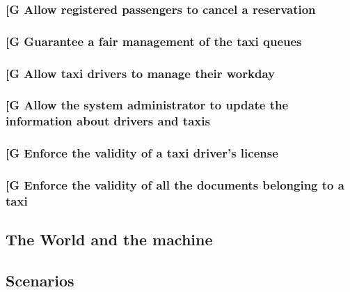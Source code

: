 \documentclass[a4paper,12pt]{article}%
\newcounter{goals_counter}
\begin{document}
\subsubsection{\label{goal\arabic{goals_counter}}{[}G\arabic{goals_counter}{]} Allow registered passengers to cancel a reservation}
\subsubsection{\label{goal\arabic{goals_counter}}{[}G\arabic{goals_counter}{]} Guarantee a fair management of the taxi queues}
\subsubsection{\label{goal\arabic{goals_counter}}{[}G\arabic{goals_counter}{]} Allow taxi drivers to manage their workday}
\subsubsection{\label{goal\arabic{goals_counter}}{[}G\arabic{goals_counter}{]} Allow the system administrator to update the information about drivers and taxis}
\subsubsection{\label{goal\arabic{goals_counter}}{[}G\arabic{goals_counter}{]} Enforce the validity of a taxi driver's license}
\subsubsection{\label{goal\arabic{goals_counter}}{[}G\arabic{goals_counter}{]} Enforce the validity of all the documents belonging to a taxi}
\subsection{The World and the machine}
\subsection{Scenarios}
\end{document}
